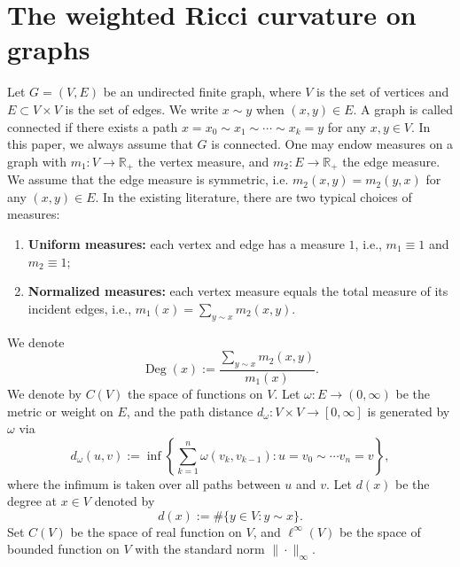 \documentclass{article}
\begin{document}




\section{The weighted Ricci curvature on graphs}\label{2}
Let $G=(V,E)$ be an undirected finite graph, where $V$ is the set of vertices and $E\subset V\times V$ is the set of edges. We write $x\sim y$ when $(x,y)\in E$.  A graph is called connected if there exists a path $x=x_0\sim x_1\sim\cdots\sim x_k=y$ for any $x,y\in V$. In this paper, we always assume that $G$ is connected.
One may endow measures on a graph with $m_1:V\rightarrow \mathbb{R}_+$  the vertex measure, and $m_2:E\rightarrow \mathbb{R}_+$ the edge measure. We assume that the edge measure is symmetric, i.e. $m_2(x,y)=m_2(y,x)$ for any $(x,y)\in E$. In the existing literature, there are two typical choices of measures:
\begin{enumerate}\label{choice}
    \item \textbf{Uniform measures:} each vertex and edge has a measure \(1\), i.e., \(m_1 \equiv 1\) and \(m_2 \equiv 1\);
    \item \textbf{Normalized measures:} each vertex measure equals the total measure 
    of its incident edges, i.e., $
    m_1(x) = \sum_{y \sim x}m_2(x,y). $
\end{enumerate}
We denote
\[\operatorname{Deg}(x):=\frac{\sum_{y\sim x} m_2(x,y)}{m_1(x)}.\]
We denote by $C(V)$ the space of functions on $V$.
Let $\omega:E\rightarrow (0,\infty)$ be the metric or weight on $E$, and the path distance $d_\omega:V\times V\rightarrow [0,\infty]$ is generated by $\omega$ via
\[d_{\omega}(u,v):=\inf\left\{\sum_{k=1}^n\omega(v_k,v_{k-1}):u=v_0\sim \cdots v_n=v\right\},\]
where the infimum is taken over all paths between $u$ and $v.$ 
Let $d(x)$ be the degree at $x\in V$ denoted  by
\[d(x):=\#\{y\in V: y\sim x\}.\]
Set $C(V)$ be the space of real function on $V$, and $\ell^\infty(V)$ be the space of bounded function on $V$ with the standard norm $\|\cdot\|_\infty$.
\end{document}
